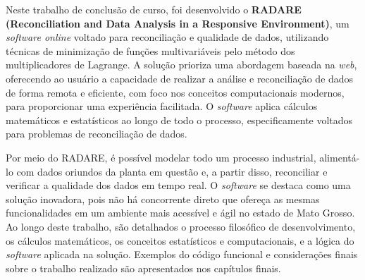 %
%


Neste trabalho de conclusão de curso, foi desenvolvido o \textbf{RADARE (Reconciliation and Data Analysis in a Responsive Environment)}, um \textit{software online} voltado para reconciliação e qualidade de dados, utilizando técnicas de minimização de funções multivariáveis pelo método dos multiplicadores de Lagrange. A solução prioriza uma abordagem baseada na \textit{web}, oferecendo ao usuário a capacidade de realizar a análise e reconciliação de dados de forma remota e eficiente, com foco nos conceitos computacionais modernos, para proporcionar uma experiência facilitada. O \textit{software} aplica cálculos matemáticos e estatísticos ao longo de todo o processo, especificamente voltados para problemas de reconciliação de dados.

Por meio do RADARE, é possível modelar todo um processo industrial, alimentá-lo com dados oriundos da planta em questão e, a partir disso, reconciliar e verificar a qualidade dos dados em tempo real. O \textit{software} se destaca como uma solução inovadora, pois não há concorrente direto que ofereça as mesmas funcionalidades em um ambiente mais acessível e ágil no estado de Mato Grosso. Ao longo deste trabalho, são detalhados o processo filosófico de desenvolvimento, os cálculos matemáticos, os conceitos estatísticos e computacionais, e a lógica do \textit{software} aplicada na solução. Exemplos do código funcional e considerações finais sobre o trabalho realizado são apresentados nos capítulos finais.


